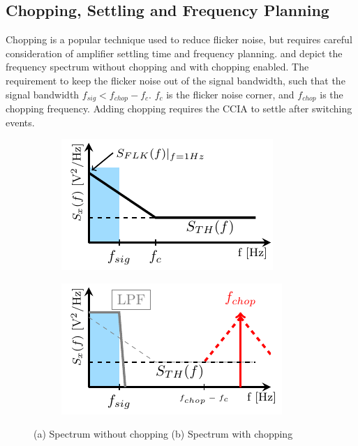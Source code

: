 \subsection{Chopping, Settling and Frequency Planning}

Chopping is a popular technique used to reduce flicker noise, but requires careful consideration of amplifier settling time and frequency planning.  and  depict the frequency spectrum without chopping and with chopping enabled. The requirement to keep the flicker noise out of the signal bandwidth, such that the signal bandwidth $f_{sig} < f_{chop} - f_{c}$. $f_{c}$ is the flicker noise corner, and $f_{chop}$ is the chopping frequency. Adding chopping requires the CCIA to settle after switching events.

\begin{figure}[!h]
        \centering
        \begin{subfigure}[c]{0.45\linewidth}
            \centering
            \includegraphics[width=\linewidth]{img/without-chopping-spectrum.pdf}
            \caption[]%
            {{\small }}
            \label{fig:without-chopping}
        \end{subfigure}
        \hfill
        \begin{subfigure}[c]{0.45\linewidth}  
            \centering 
            \includegraphics[width=\linewidth]{img/chopping-spectrum.pdf}
            \caption[]%
            {{\small }}
            \label{fig:chopping}
        \end{subfigure}
        \caption[ Don't write caption here ]
        {\small (a) Spectrum without chopping (b) Spectrum with chopping} 
        \label{fig:with-chopping}
\end{figure}

